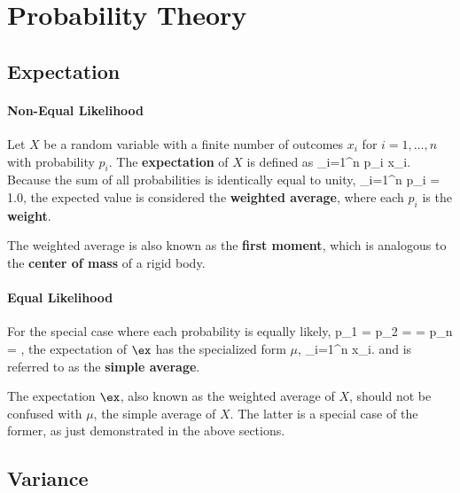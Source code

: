 \chapter{Probability Theory}

\section{Expectation}

\subsubsection{Non-Equal Likelihood}

Let $X$ be a random variable with a finite number of outcomes $x_i$
for $i=1,\ldots,n$ with probability $p_i$.  The {\bf expectation} 
of $X$ is defined as
\be
\ex {} \sum_{i=1}^n p_i \; x_i.
\ee
Because the sum of all probabilities is identically equal to unity,
\be
\sum_{i=1}^n p_i = 1.0,
\ee
the expected
value is considered the {\bf weighted average}, where each $p_i$ is the 
{\bf weight}.

\begin{Hremark}
The weighted average is also known as the {\bf first moment}, which is 
analogous to the {\bf center of mass} of a rigid body.
\end{Hremark}

\subsubsection{Equal Likelihood}
For the special case where each probability is equally likely, 
\be
p_1 = p_2 = \cdots = p_n = ,
\label{eq:equal_probability}
\ee
the expectation of $\ex$ has the specialized form $\mu$,
\be
\mu {} \ex \overset{(\ref{eq:equal_probability})}{=} 
 \sum_{i=1}^n \; x_i.
\label{eq:simple_average}
\ee
and is referred to as the {\bf simple average}.

\begin{Hremark}
The expectation $\ex$, 
also known as the weighted average of $X$, should
not be confused with $\mu$, the simple average of $X$.  
The latter is a special
case of the former, as just demonstrated in the above sections.
\end{Hremark}

\section{Variance}


